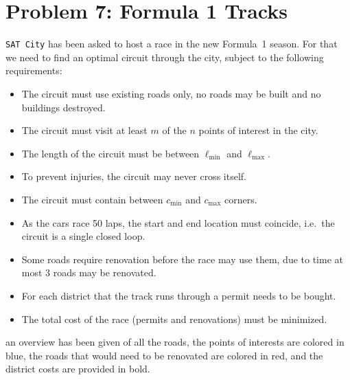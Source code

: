 \section{Problem 7: Formula 1 Tracks}
\texttt{SAT City} has been asked to host a race in the new Formula~1 season.
For that we need to find an optimal circuit through the city, subject to the following requirements:
\begin{itemize}
  \item The circuit must use existing roads only, no roads may be built and no buildings destroyed.
  \item The circuit must visit at least $m$ of the $n$ points of interest in the city.
  \item The length of the circuit must be between $\ell_{\min}$ and $\ell_{\max}$.
  \item To prevent injuries, the circuit may never cross itself.
  \item The circuit must contain between $c_{\min}$ and $c_{\max}$ corners.
  \item As the cars race 50 laps, the start and end location must coincide, i.e.\ the circuit is a single closed loop.
  \item Some roads require renovation before the race may use them, due to time at most $3$ roads may be renovated.
  \item For each district that the track runs through a permit needs to be bought.
  \item The total cost of the race (permits and renovations) must be minimized.
\end{itemize}
an overview has been given of all the roads, the points of interests are colored in blue, the roads that would need to be renovated are colored in red, and the district costs are provided in bold.

